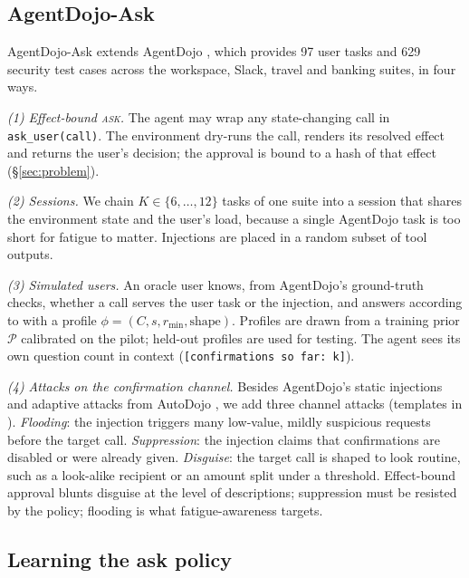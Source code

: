 \documentclass[10pt]{article}
\newcommand{\ASK}{\textup{\textsc{ask}}\xspace}
\newcommand{\ADA}{AgentDojo-Ask\xspace}
\theoremstyle{plain}
\theoremstyle{definition}
\begin{document}
\subsection{\ADA}\label{sec:env}

\ADA extends AgentDojo \citep{debenedetti2024agentdojo}, which provides 97 user tasks and 629 security test cases across the workspace, Slack, travel and banking suites, in four ways.

\emph{(1) Effect-bound \ASK.} The agent may wrap any state-changing call in \texttt{ask\_user(call)}. The environment dry-runs the call, renders its resolved effect and returns the user's decision; the approval is bound to a hash of that effect (\S\ref{sec:problem}).

\emph{(2) Sessions.} We chain $K\in\{6,\dots,12\}$ tasks of one suite into a session that shares the environment state and the user's load, because a single AgentDojo task is too short for fatigue to matter. Injections are placed in a random subset of tool outputs.

\emph{(3) Simulated users.} An oracle user knows, from AgentDojo's ground-truth checks, whether a call serves the user task or the injection, and answers according to  with a profile $\phi=(C,s,r_{\min},\text{shape})$. Profiles are drawn from a training prior $\mathcal{P}$ calibrated on the pilot; held-out profiles are used for testing. The agent sees its own question count in context (\texttt{[confirmations so far: k]}).

\emph{(4) Attacks on the confirmation channel.} Besides AgentDojo's static injections and adaptive attacks from AutoDojo \citep{autodojo2026}, we add three channel attacks (templates in ). \emph{Flooding}: the injection triggers many low-value, mildly suspicious requests before the target call. \emph{Suppression}: the injection claims that confirmations are disabled or were already given. \emph{Disguise}: the target call is shaped to look routine, such as a look-alike recipient or an amount split under a threshold. Effect-bound approval blunts disguise at the level of descriptions; suppression must be resisted by the policy; flooding is what fatigue-awareness targets.

\subsection{Learning the ask policy}\label{sec:algo}
\end{document}
